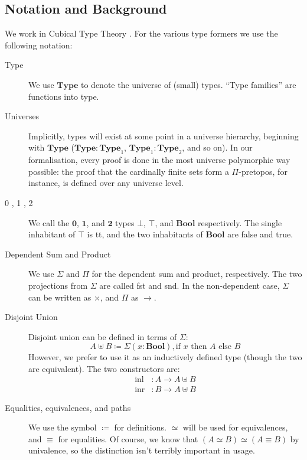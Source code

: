 \subsection{Notation and Background}
We work in Cubical Type Theory \cite{cohenCubicalTypeTheory2016}.
For the various type formers we use the following notation:
\begin{description}
  \item[Type] We use \(\mathbf{Type}\) to denote the universe of (small) types.
    ``Type families'' are functions into type.
  \item[Universes]
    Implicitly, types will exist at some point in a universe hierarchy,
    beginning with \(\mathbf{Type}\) (\(\mathbf{Type} : \mathbf{Type}_1\),
    \(\mathbf{Type}_1 : \mathbf{Type}_2\), and so on).
    In our formalisation, every proof is done in the most universe polymorphic
    way possible: the proof that the cardinally finite sets form a
    \(\Pi\)-pretopos, for instance, is defined over any universe level.
  \item[0 , 1 , 2] We call the \(\mathbf{0}\), \(\mathbf{1}\), and
    \(\mathbf{2}\) types \(\bot\), \(\top\), and \(\mathbf{Bool}\) respectively.
    The single inhabitant of \(\top\) is tt, and the two inhabitants of
    \(\mathbf{Bool}\) are false and true.
  \item[Dependent Sum and Product] We use \(\Sigma\) and \(\Pi\) for the
    dependent sum and product, respectively.
    The two projections from \(\Sigma\) are called fst and snd.
    In the non-dependent case, \(\Sigma\) can be written as \(\times\), and
    \(\Pi\) as \(\rightarrow\).
  \item[Disjoint Union] Disjoint union can be defined in terms of \(\Sigma\):
    \begin{equation}
      A \uplus B \coloneqq \Sigma(x : \mathbf{Bool}) , \text{if } x \text{ then } A \text{ else } B
    \end{equation}
    However, we prefer to use it as an inductively defined type (though the two
    are equivalent).
    The two constructors are:
    \begin{equation}
      \begin{aligned}
        \text{inl} &: A \rightarrow A \uplus B \\
        \text{inr} &: B \rightarrow A \uplus B
      \end{aligned}
    \end{equation}
  \item[Equalities, equivalences, and paths] We use the symbol \(\coloneqq\)
    for definitions.
    \(\simeq\) will be used for equivalences, and \(\equiv\) for equalities.
    Of course, we know that \((A \simeq B) \simeq (A \equiv B)\) by univalence,
    so the distinction isn't terribly important in usage.
\end{description}

